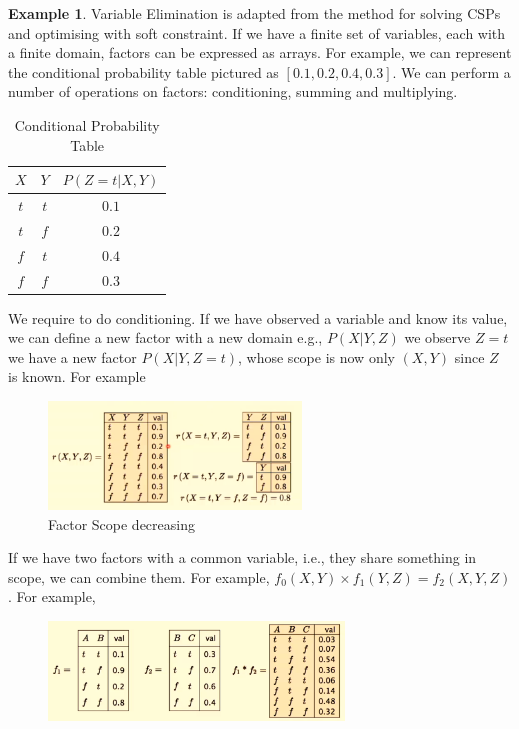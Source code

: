 \documentclass[a4paper]{article}
\theoremstyle{plain}
\theoremstyle{definition}
\newtheorem{exmp}{Example}[section]
\theoremstyle{remark}
\begin{document}
\begin{exmp}
	Variable Elimination is adapted from the method for solving CSPs and optimising with soft constraint. If we have a finite set of variables, each with a finite domain, factors can be expressed as arrays. For example, we can represent the conditional probability table pictured as $[0.1,0.2,0.4,0.3]$. We can perform a number of operations on factors: conditioning, summing and multiplying.
	\begin{table}[H]
		\centering
		\caption{Conditional Probability Table}
		\label{tab:label}
		\begin{tabular}{cc|c}
			\hline
		$X$ & $Y$ & $P(Z=t | X,Y)$ \\
		\hline
		$t$ & $t$ & $0.1$ \\
		$t$ & $f$ & $0.2$ \\
		$f$ & $t$ & $0.4$ \\
		$f$ & $f$ & $0.3$ \\
		\hline
		\end{tabular}
	\end{table}
We require to do conditioning. If we have observed a variable and know its value, we can define a new factor with a new domain e.g., $P(X|Y,Z)$ we observe $Z=t$ we have a new factor $P(X|Y,Z=t)$, whose scope is now only $(X,Y)$ since $Z$ is known. For example
\begin{figure}[H]
	\centering
	\includegraphics[width=0.6\textwidth]{fac.png}
	\caption{Factor Scope decreasing}
	\label{fig:fac-png}
\end{figure}
If we have two factors with a common variable, i.e., they share something in scope, we can combine them. For example, $f_0(X,Y)\times f_1(Y,Z) = f_2(X,Y,Z)$. For example,
\begin{figure}[H]
	\centering
	\includegraphics[width=0.7\textwidth]{fac2.png}

\end{figure}
\end{exmp}
\end{document}
